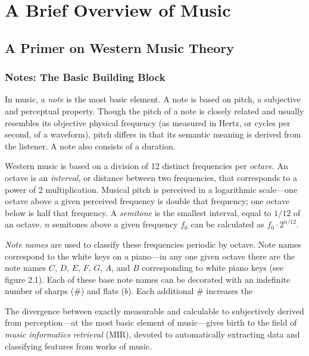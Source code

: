\chapter{A Brief Overview of Music}

\section{A Primer on Western Music Theory}

\subsection{Notes: The Basic Building Block}

In music, a \textit{note} is the most basic element. A note is based on pitch, a subjective and perceptual property. Though the pitch of a note is closely related and usually resembles its objective physical frequency (as measured in Hertz, or cycles per second, of a waveform), pitch differs in that its semantic meaning is derived from the listener. A note also consists of a duration.

Western music is based on a division of 12 distinct frequencies per \textit{octave}. An octave is an \textit{interval}, or distance between two frequencies, that corresponds to a power of 2 multiplication. Musical pitch is perceived in a logarithmic scale---one octave above a given perceived frequency is double that frequency; one octave below is half that frequency. A \textit{semitone} is the smallest interval, equal to $1/12$ of an octave. $n$ semitones above a given frequency $f_0$ can be calculated as $f_0 \cdot 2^{n/12}$.

\textit{Note names} are used to classify these frequencies periodic by octave. Note names correspond to the white keys on a piano---in any one given octave there are the note names $C$, $D$, $E$, $F$, $G$, $A$, and $B$ corresponding to white piano keys (see figure 2.1). Each of these base note names can be decorated with an indefinite number of sharps ($\#$) and flats ($b$). Each additional $\#$ increases the 

The divergence between exactly measurable and calculable to subjectively derived from perception---at the most basic element of music---gives birth to the field of \textit{music informatics retrieval} (MIR), devoted to automatically extracting data and classifying features from works of music.